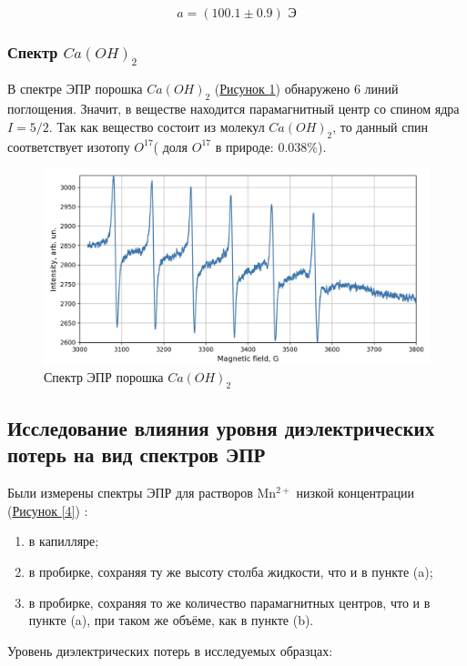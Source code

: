 \documentclass{article}
\begin{document}
\begin{equation*}   
    a=(100.1 \pm 0.9)\text{ Э}
\end{equation*}

\subsubsection{Спектр $Ca(OH)_2$}

В спектре ЭПР порошка $Ca(OH)_2$ (\hyperref[3]{Рисунок \ref*{3}}) обнаружено  6 линий поглощения. Значит,  в веществе
находится парамагнитный центр со спином ядра $I=5/2$. Так как вещество состоит из молекул  $Ca(OH)_2$, то данный спин соответствует изотопу $O^{17}$( доля $O^{17}$ в природе: $0.038\%$).

\begin{figure}[h!]
        \centering
        \includegraphics[scale = 0.2]{3.jpeg}
        \caption{Спектр ЭПР порошка $Ca(OH)_2$}
        \label{3}
    \end{figure}

\subsection{Исследование влияния уровня диэлектрических потерь на вид спектров ЭПР}

Были измерены спектры ЭПР для растворов Mn$^{2+}$ низкой концентрации (\hyperref[4]{Рисунок \ref*{4}}) :
\begin{enumerate}
	\item в капилляре;
	\item в пробирке, сохраняя ту же высоту столба жидкости, что и в пункте (a);
	\item в пробирке, сохраняя то же количество парамагнитных центров,
	что и в пункте (a), при таком же объёме, как в пункте (b).
\end{enumerate}
Уровень диэлектрических потерь в исследуемых образцах:
\end{document}
